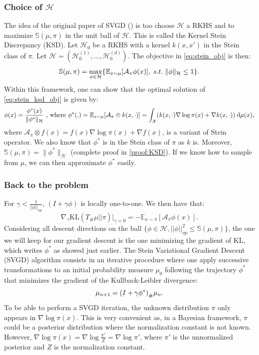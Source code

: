 \documentclass{article}
\newcommand{\E}{\mathbb{E}}
\renewcommand{\S}{\mathbb{S}}
\newcommand{\X}{\mathcal{X}}
\newcommand{\A}{\mathcal{A}}
\newcommand{\KL}{\mathrm{KL}}
\renewcommand{\H}{\mathcal{H}}
\renewcommand{\S}{\mathbb{S}}
\renewcommand{\d}{\: \mathrm{d}}
\DeclarePairedDelimiter{\pare}{(}{)}
\DeclarePairedDelimiter{\bra}{\{}{\}}
\DeclarePairedDelimiter{\sq}{[}{]}
\begin{document}
\subsubsection{Choice of $\H$}\label{sec:RKHS}
The idea of the original paper of SVGD (\cite{Original-SVGD}) is too choose $\H$ a RKHS and
to maximize $\S(\mu, \pi)$ in the unit ball of $\H$. This is called the Kernel Stein Discrepancy (KSD). \newline
Let $\H_0$ be a RKHS with a kernel $k(x, x')$ in the Stein class of $\pi$.
Let $\H = (\H^{(1)}_0, \dots, \H^{(d)}_0)$.
The objective in \eqref{eq:stein_obj} is then:
\begin{equation}
  \S(\mu, \pi) =
    \max_{\phi \in \H} \bra*{ \E_{x \sim \mu}[\A_\pi \phi (x)], \; s.t. \; \|\phi\|_{\H} \leq 1 }.
  \label{eq:stein_ksd_obj}
\end{equation}
Within this framework, one can show that the optimal solution of \eqref{eq:stein_ksd_obj}
is given by:
\begin{equation}
  \phi(x) = \frac{\phi^*(x)}{\|\phi^*\|_{\H}}
    \text{ , where } \phi^*(.) = \E_{x \sim \mu}\sq*{ \A_\pi \otimes k(x, \cdot) }
                               = \int_\X (k(x, \cdot) \nabla \log \pi(x) + \nabla k(x, \cdot)) \d \mu(x),
  \label{eq:stein_ksd_sol}        
\end{equation}
where $\A_\pi \otimes f(x) =  f(x) \nabla \log \pi(x) + \nabla f(x)$, is a variant of Stein operator. We also know that $\phi^*$ is in the Stein class of $\pi$ as $k$ is.
Moreover, $\S(\mu, \pi) = \|\phi^*\|_\H$ (complete proof in \ref{proof:KSD}).
If we know how to sample from $\mu$, we can then approximate $\phi^*$ easily.
\subsubsection{Back to the problem}
For $\gamma < \frac{1}{||\phi||_{op}}$, $(I+\gamma \phi)$ is locally one-to-one. We then have that: $$\nabla_\gamma \KL(T_\#\mu||\pi)|_{\gamma = 0} = - \E_{x\sim \pi}[\A_\pi \phi(x)].$$ 
Considering all descent directions on the ball $\{\phi\in \H, ||\phi||^2_{op} \leq \S(\mu,\pi)\}$, the one we will keep for our gradient descent is the one minimizing the gradient of $\KL$, which writes $\phi^*$ as showed just earlier. \newline
The Stein Variational Gradient Descent (SVGD) algorithm consists
in an iterative procedure where one apply successive transformations
to an initial probability measure $\mu_0$ following
the trajectory $\phi^*$ that minimizes the gradient of the Kullback-Leibler divergence:
\begin{equation}
  \mu_{n+1} = \pare*{ I + \gamma \phi^* }_\# \mu_n.
  \label{eq:mu-n}
\end{equation}
To be able to perform a SVGD iteration, the unknown distribution $\pi$ only appears
in $\nabla \log \pi(x)$. This is very convenient as, in a Bayesian framework,
$\pi$ could be a posterior distribution where the normalization constant is not known.
However, $\nabla \log \pi(x) = \nabla \log \frac{\pi'}{Z} = \nabla \log \pi'$,
where $\pi'$ is the unnormalized posterior and $Z$ is the normalization constant.
\end{document}
